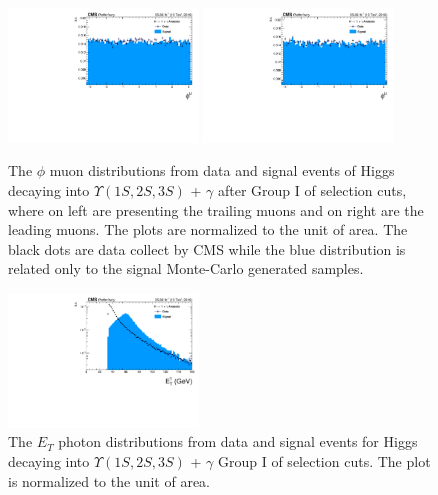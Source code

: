 \begin{figure}[!htbp]
\begin{center}
\includegraphics[width=0.45\textwidth]{figures_and_tables/outputPlots/HtoUpsilon_Cat0_ZZZZZ/au/data_x_mc/noKinCuts/h_noKin_TrailingMu_phi}\hspace*{1.cm}
\includegraphics[width=0.45\textwidth]{figures_and_tables/outputPlots/HtoUpsilon_Cat0_ZZZZZ/au/data_x_mc/noKinCuts/h_noKin_LeadingMu_phi}
\end{center}\vspace*{-.5cm}
\caption{The $\phi$ muon distributions from data and signal events of Higgs decaying into $\Upsilon(1S,2S,3S)$ + $\gamma$ after Group I of selection cuts, where on left are presenting the trailing muons and on right are the leading muons. The plots are normalized to the unit of area. The black dots are data collect by CMS while the blue distribution is related only to the signal Monte-Carlo generated samples.}
\label{fig:phiMuons_HtoUpsilon_Cat0}
\end{figure}


\begin{figure}[!htbp]
\begin{center}
\includegraphics[width=0.45\textwidth]{figures_and_tables/outputPlots/HtoUpsilon_Cat0_ZZZZZ/au/data_x_mc/noKinCuts/h_noKin_Photon_pt}\hspace*{1.cm}
\end{center}\vspace*{-.5cm}
\caption{The $E_{T}$ photon distributions from data and signal events for Higgs decaying into $\Upsilon(1S,2S,3S)$ + $\gamma$ Group I of selection cuts. The plot is normalized to the unit of area.}
\label{fig:pTPhoton_HtoUpsilon_Cat0}
\end{figure}


